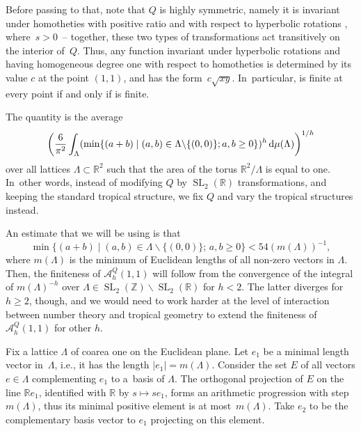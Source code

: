 \documentclass[10pt,a4paper]{amsart}
\numberwithin{equation}{section}
\theoremstyle{definition}
\begin{document}
Before passing to that, note that $Q$ is highly symmetric, namely it is invariant under homotheties with positive ratio and with respect to hyperbolic rotations , where~${s>0}$~-- together, these two types of transformations act transitively on the interior of~$Q$. Thus, any function invariant under hyperbolic rotations and having homogeneous degree one with respect to homotheties is determined by its value $c$ at the point $(1,1)$, and has the form~$c\sqrt{xy}$. In~particular,  is finite at every point if and only if  is finite.

The quantity  is the average
\[
\biggl(\frac{6}{\pi^2}\int_{\Lambda}(\min\{(a+b)\mid (a,b)\in\Lambda\backslash\{(0,0)\}; a,b\geq 0\})^h\, {\rm d}\mu(\Lambda)\biggr)^{1/h}
\]
over all lattices $\Lambda\subset\mathbb{R}^2$ such that the area of the torus $\mathbb{R}^2\slash\Lambda$ is equal to one. In~other words, instead of modifying $Q$ by $\operatorname{SL}_2(\mathbb{R})$ transformations, and keeping the standard tropical structure, we fix $Q$ and vary the tropical structures instead.

An estimate that we will be using is that \begin{equation}\tag{$\star$}\label{eq_star}
\min\{(a+b) \mid (a,b)\in\Lambda\backslash\{(0,0)\};\, a,b\geq 0\}<54(m(\Lambda))^{-1},\end{equation}
where $m(\Lambda)$ is the minimum of Euclidean lengths of all non-zero vectors in $\Lambda$. Then, the finiteness of $\mathcal{A}^Q_h(1,1)$ will follow from the convergence of the integral of $ m(\Lambda)^{-h}$ over $\Lambda\in\operatorname{SL}_2(\mathbb{Z})\backslash\operatorname{SL}_2(\mathbb{R})$ for $h<2$. The latter diverges for $h\geq 2$, though, and we would need to work harder at the level of interaction between number theory and tropical geometry to extend the finiteness of $\mathcal{A}^Q_h(1,1)$ for other $h$.

Fix a lattice $\Lambda$ of coarea one on the Euclidean plane. Let $e_1$ be a minimal length vector in~$\Lambda$, i.e., it has the length $|e_1|=m(\Lambda)$. Consider the set $E$ of all vectors $e\in\Lambda$ complementing $e_1$ to a~basis of $\Lambda$. The orthogonal projection of $E$ on the line $\mathbb{R}e_1$, identified with $\mathbb{R}$ by $s\mapsto s e_1$, forms an arithmetic progression with step~$m(\Lambda)$, thus its minimal positive element is at most~$m(\Lambda)$. Take $e_2$ to be the complementary basis vector to $e_1$ projecting on this element.
\end{document}
